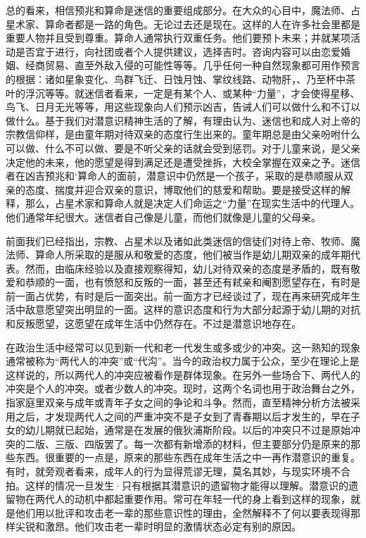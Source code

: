 \documentclass[UTF8,10pt,a4paper,openany]{book}
\begin{document}
总的看来，相信预兆和算命是迷信的重要组成部分。在大众的心目中，魔法师、占星术家、算命者都是一路的角色。无论过去还是现在。这样的人在许多社会里都是重要人物并且受到尊重。算命人通常执行双重任务。他们要预卜未来；并就某项活动是否宜于进行，向社团或者个人提供建议，选择吉时。咨询内容可以由恋爱婚姻、经商贸易、直至外敌入侵的可能性等等。几乎任何一种自然现象都可用作预言的根据：诸如星象变化、鸟群飞迁、日蚀月蚀、掌纹线路、动物肝，、乃至杯中茶叶的浮沉等等。就迷信者看来，一定是有某个人、或某种“力量”，才会使得星移、鸟飞、日月无光等等，用这些现象向人们预示凶吉，告诫人们可以做什么和不订以做什么。基于我们对潜意识精神生活的了解，有理由认为、迷信也和成人对上帝的宗教信仰样，是由童年期对待双亲的态度行生出来的。童年期总是由父亲吩咐什么可以做、什么不可以做、要是不听父亲的话就会受到惩罚。对于儿童来说，是父亲决定他的未来，他的愿望是得到满足还是遭受挫拆，大校全掌握在双亲之予。迷信者在凶吉预兆和`算命人的面前，潜意识中仍然是一个孩子，采取的是恭顺服从双亲的态度、揣度并迎合双亲的意识，博取他们的慈爱和帮助。要是接受这样的解释，那么，占星术家和算命人就是决定人们命运之“力量”在现实生活中的代理人。他们通常年纪很大。迷信者自己像是儿童，而他们就像是儿童的父母亲。

前面我们已经指出，宗教、占星术以及诸如此类迷信的信徒们对待上帝、牧师、魔法师、算命人所采取的是服从和敬爱的态度，他们被当作是幼儿期双亲的成年期代表。然而，由临床经验以及直接观察得知，幼儿对待双亲的态度是矛盾的，既有敬爱和恭顺的一面，也有愤怒和反叛的一面，甚至还有弒亲和阉割愿望存在，有时是前一面占优势，有时是后一面突出。前一面方才已经谈过了，现在再来研究成年生活中敌意愿望突出明显的一面。这样的意识态度和行为大部分起源于幼儿期的对抗和反叛愿望，这愿望在成年生活中仍然存在。不过是潜意识地存在。

在政治生活中经常可以见到新一代和老一代发生或多或少的冲突。这一熟知的现象通常被称为“两代人的冲突”或“代沟”。当今的政治权力属于公众，至少在理论上是这样说的，所以两代人的冲突应被看作是群体现象。在另外一些场合下、两代人的冲突是个人的冲突。或者少数人的冲突。现时，这两个名词也用于政治舞台之外，指家庭里双亲与成年或青年子女之间的争论和斗争。然而，直至精神分析方法被采用之后，才发现两代人之间的严重冲突不是子女到了青春期以后才发生的，早在子女的幼儿期就已起始，通常是在发展的俄狄浦斯阶段。以后的冲突只不过是原始冲突的二版、三版、四版罢了。每一次都有新增添的材料，但主要部分仍是原来的那些东西。很重要的一点是，原来的那些东西在成年生活之中一再作潜意识的重复。有时，就旁观者看来，成年人的行为显得荒谬无理，莫名其妙，与现实环境不合拍。这样的情况一旦发生·只有根据其潜意识的遗留物才能得以理解。潜意识的遗留物在两代人的动机中都起重要作用。常可在年轻一代的身上看到这样的现象，就是他们用以批评和攻击老一辈的那些意识性的理由，全然解释不了何以要表现得那样尖锐和激昂。他们攻击老一辈时明显的激情状态必定有别的原因。
\end{document}
